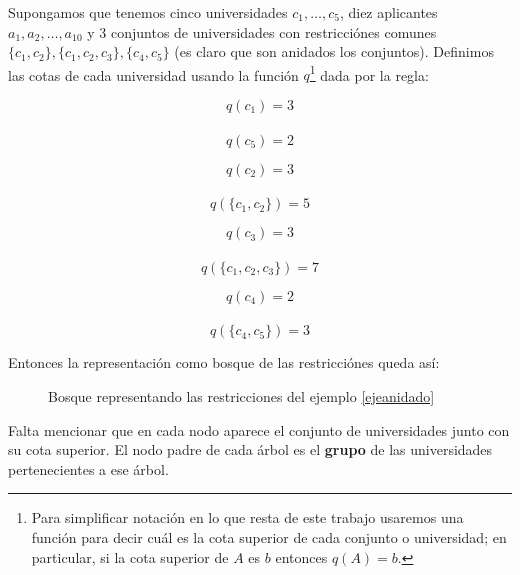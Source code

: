\begin{eje}\label{ejeanidado}
Supongamos que tenemos cinco universidades $c_1,\dots,c_5$, diez aplicantes $a_1,a_2,\dots,a_{10}$ y 3 conjuntos de universidades con restricciónes comunes $\{c_1,c_2\},\{c_1,c_2,c_3\},\{c_4,c_5\}$ (es claro que son anidados los conjuntos). Definimos las cotas de cada universidad usando la función $q$\footnote{Para simplificar notación en lo que resta de este trabajo usaremos una función para decir cuál es la cota superior de cada conjunto o universidad; en particular, si la cota superior de $A$ es $b$ entonces $q(A)=b$.} dada por la regla:

 \begin{minipage}{.25\linewidth}
$$q(c_1)=3$$ \\
$$q(c_5)=2$$ 
\end{minipage}%
\begin{minipage}{.25\linewidth}
$$q(c_2)=3$$ \\
$$q(\{c_1,c_2\})=5$$ 
\end{minipage}
\begin{minipage}{.25\linewidth}
$$q(c_3)=3$$ \\
$$q(\{c_1,c_2,c_3\})=7$$ 
\end{minipage}
\begin{minipage}{.25\linewidth}
$$q(c_4)=2$$ \\
$$q(\{c_4,c_5\})=3$$ 
\end{minipage}

Entonces la representación como bosque de las restricciónes queda así:

\begin{figure}[H]
\noindent \begin{minipage}{.5\linewidth}
\centering
{}
\end{minipage}%
 \begin{minipage}{.5\linewidth}
\centering
{}
\end{minipage}%
\caption{Bosque representando las restricciones del ejemplo \ref{ejeanidado}}
\end{figure}
Falta mencionar que en cada nodo aparece el conjunto de universidades junto con su cota superior. El nodo padre de cada árbol es el \textbf{grupo} de las universidades pertenecientes a ese árbol. \fin
\end{eje}

